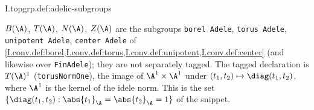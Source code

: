\begin{definition}
\end{definition}
\begin{tfformal}{I.topgrp.def:adelic-subgroups}
\begin{tffidelity}
$B(\A)$, $T(\A)$, $N(\A)$, $Z(\A)$ are the subgroups \texttt{borel Adele}, \texttt{torus Adele}, \texttt{unipotent Adele}, \texttt{center Adele} of \cref{I.conv.def:borel,I.conv.def:torus,I.conv.def:unipotent,I.conv.def:center} (and likewise over \texttt{FinAdele}); they are not separately tagged. The tagged declaration is $T(\A)^1$ (\texttt{torusNormOne}), the image of $\A^1\times\A^1$ under $(t_1,t_2)\mapsto\diag(t_1,t_2)$, where $\A^1$ is the kernel of the idele norm. This is the set $\{\diag(t_1,t_2):\abs{t_1}_\A=\abs{t_2}_\A=1\}$ of the snippet.
\end{tffidelity}
\end{tfformal}

